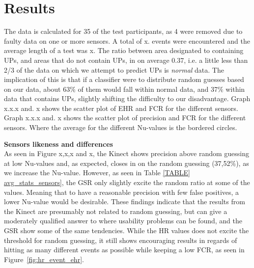 \section{Results}
The data is calculated for 35 of the test participants, as 4 were removed due to faulty data on one or more sensors.	
A total of x. events were encountered and the average length of a test was x.
The ratio between area designated to containing UPs, and areas that do not contain UPs, in on average 0.37, i.e. a
little less than 2/3 of the data on which we attempt to predict UPs is \textit{normal} data. The implication of this is
that if a classifier were to distribute random guesses based on our data, about 63\% of them would fall within normal
data, and 37\% within data that contains UPs, slightly shifting the difficulty to our disadvantage.
Graph x.x.x and. x shows the scatter plot of EHR and FCR for the different sensors. 
Graph x.x.x and. x shows the scatter plot of precision and FCR for the different sensors. Where the average for the different Nu-values is the bordered circles.



\textbf{Sensors likeness and differences}\\
As seen in Figure x,x,x and x, the Kinect shows precision above random guessing at low Nu-values and,
as expected, closes in on the random guessing (37,52\%), as we increase the Nu-value. However, as seen in Table
\ref{TABLE] avg_stats_sensors}, the GSR only slightly excite the random ratio at some of the values. Meaning that
to have a reasonable precision with few false positives, a lower Nu-value would be desirable.
These findings indicate that the results from the Kinect are presumably not related to random guessing, but can give a moderately qualified answer to where usability problems can be found, and the GSR show some of the same tendencies.
While the HR values does not excite the threshold for random guessing, it still shows encouraging results in regards of hitting as many different events as possible while keeping a low FCR, as seen in Figure~\ref{fig:hr_event_ehr}.




